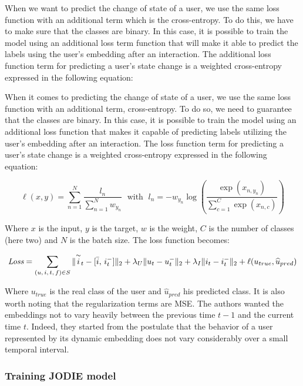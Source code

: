 When we want to predict the change of state of a user, we use the same loss function with an additional term which is the cross-entropy. To do this, we have to make sure that the classes are binary. In this case, it is possible to train the model using an additional loss term function that will make it able to predict the labels using the user's embedding after an interaction. The additional loss function term for predicting a user's state change is a weighted cross-entropy expressed in the following equation:

When it comes to predicting the change of state of a user, we use the same loss function with an additional term, cross-entropy. To do so, we need to guarantee that the classes are binary. In this case, it is possible to train the model using an additional loss function that makes it capable of predicting labels utilizing the user's embedding after an interaction. The loss function  term for predicting a user's state change is a weighted cross-entropy expressed in the following equation:

\begin{equation}
    \ell(x,y) = \sum_{n=1}^N \frac{l_n}{\sum_{n=1}^N w_{y_n}} \; \text{ with } \;
    l_n = -w_{y_n} \log \left ( \frac{\exp(x_{n,y_n})}{\sum_{c=1}^C \exp(x_{n,c})} \right )
\end{equation}

Where $x$ is the input, $y$ is the target, $w$ is the weight, $C$ is the number of classes (here two) and $N$ is the batch size. The loss function becomes:

\begin{equation}
    \textit{Loss} = \sum_{(u,\,i,\,t,\,f) \in S} \| \overset{\sim}{i}_t - [\Bar{i},\,i_t^-] \|_2 + \lambda_U \|u_t - u_t^-\|_2 + \lambda_I \|i_t - i_t^-\|_2 + \ell (u_{true}, \widehat u_{pred})
\end{equation}

Where $u_{true}$ is the real class of the user and $\widehat u_{pred}$ his predicted class. It is also worth noting that the %
regularization terms are MSE. The authors wanted the embeddings not to vary heavily between the previous time $t-1$ and the current time $t$. Indeed, they started from the postulate that the behavior of a user represented by its dynamic embedding does not vary considerably over a small temporal interval.\\

\subsubsection{Training JODIE model} 
\label{sec:training}

